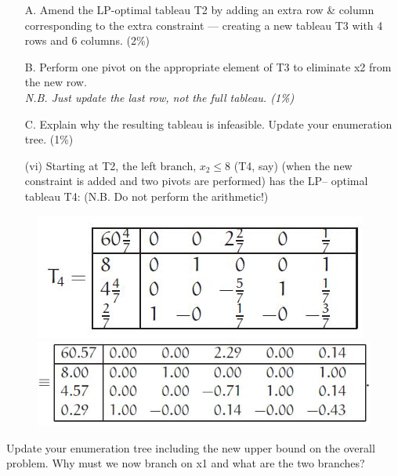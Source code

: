\documentclass{beamer}
\begin{document}
\begin{frame}
\begin{frame}
\end{frame}
\begin{frame}
\large
\begin{itemize}
\item[A.] Amend the LP-optimal tableau T2 by adding an extra row \&
column corresponding to the extra constraint — creating a
new tableau T3 with 4 rows and 6 columns. (2\%) \bigskip
\item[B.] Perform one pivot on the appropriate element of T3 to eliminate
x2 from the new row. \\ \textit{N.B. Just update the last row,
not the full tableau. (1\%)}
\bigskip
\item[C.] Explain why the resulting tableau is infeasible. Update your
enumeration tree. (1\%)
\end{itemize}

\end{frame}
\begin{frame}
	
\begin{itemize}
\item[(vi)] Starting at T2, the left branch, $x_2 \leq 8$ (T4, say) (when the new
constraint is added and two pivots are performed) has the LP–
optimal tableau T4: (N.B. Do not perform the arithmetic!)
\end{itemize}


\end{frame}
\begin{frame}
\begin{figure}
\centering
\includegraphics[width=0.7\linewidth]{Exam14-f}\\
\includegraphics[width=0.7\linewidth]{Exam14-g}
\end{figure}
\end{frame}
\begin{frame}
\large
Update your enumeration tree including the new upper bound on
the overall problem. Why must we now branch on x1 and what
are the two branches? 




\end{frame}
\end{frame}
\end{document}
